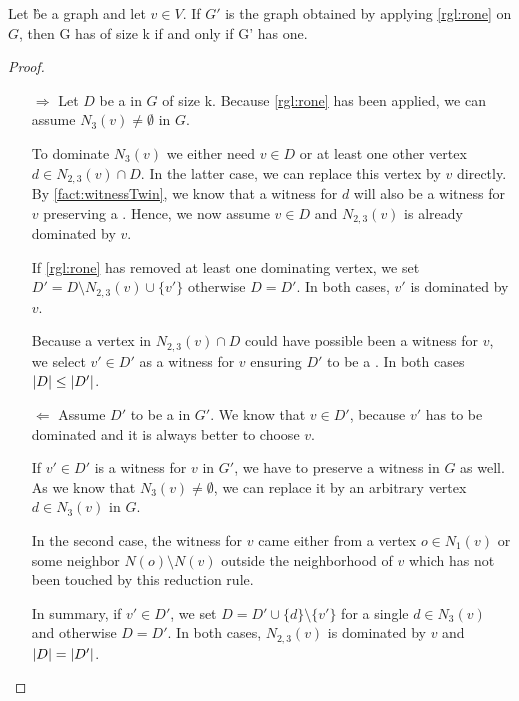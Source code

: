 \begin{lemma}\label{lemma:correctnessone}
    Let \G be a graph and let $v \in V$. If $G'$ is the graph obtained by applying \cref{rgl:rone}   on $G$, then G has \sdom of size k if and only if G' has one.
\end{lemma}
\begin{proof}
    \begin{enumerate}
        \item[$\Rightarrow$] Let $D$ be a \sdom in $G$ of size k. 
        Because \cref{rgl:rone} has been applied, we can assume $N_3(v) \neq \emptyset$ in $G$. 
        
        To dominate $N_3(v)$ we either need $v \in D$ or at least one other vertex $d \in N_{2,3}(v) \cap D$. In the latter case, we can replace this vertex by $v$ directly. By \cref{fact:witnessTwin}, we know that a witness for $d$ will also be a witness for $v$ preserving a \sdom. Hence, we now assume $v \in D$ and $N_{2,3}(v)$ is already dominated by $v$.

        If \cref{rgl:rone} has removed at least one dominating vertex, we set $D' = D \setminus N_{2,3}(v) \cup \{v'\}$ otherwise $D = D'$. In both cases, $v'$ is dominated by $v$.

        Because a vertex in $N_{2,3}(v) \cap D$ could have possible been a witness for $v$, we select $v' \in D'$ as a witness for $v$ ensuring $D'$ to be a \sdom. In both cases $\abs{D} \leq \abs{D'}$.

        \item[$\Leftarrow$]  Assume $D'$ to be a \sdom in $G'$. We know that $v \in D'$, because $v'$ has to be dominated and it is always better to choose $v$.

        If $v' \in D'$ is a witness for $v$ in $G'$, we have to preserve a witness in $G$ as well. As we know that $N_3(v) \neq \emptyset$, we can replace it by an arbitrary vertex $d \in N_3(v)$ in $G$. 
        
        In the second case, the witness for $v$ came either from a vertex $o \in N_1(v)$ or some neighbor $N(o) \setminus N(v)$ outside the neighborhood of $v$ which has not been touched by this reduction rule. 
        
        In summary, if $v' \in D'$, we set $D = D' \cup \{d\} \setminus \{v'\}$ for a single $d \in N_3(v)$ and otherwise $D = D'$. In both cases, $N_{2,3}(v)$ is dominated by $v$ and $\abs{D} = \abs{D'}$.
    \end{enumerate}
\end{proof}


